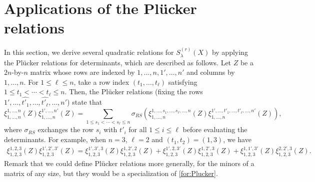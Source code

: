 \documentclass[12pt]{amsart}%
\theoremstyle{definition}
\begin{document}

\section{Applications of the Pl\"{u}cker relations
}
\label{pformula}

In this section,
we derive several quadratic relations for $S^{(r)}_{\lambda}(X)$ by applying the Pl\"{u}cker relations for determinants, which are described as follows.
Let $Z$ be a $2n$-by-$n$ matrix whose rows are indexed by $1,\ldots,n,1',\ldots,n'$ and columns by $1,\ldots,n$.
For $1\leq \ell\leq n$, 
take a row index $(t_1,\ldots,t_\ell)$ satisfying 
$1\leq t_1<\cdots<t_\ell\leq n$.
Then, the Pl\"ucker relations (fixing the rows $1',\ldots,\widehat{t'_1},\ldots,\widehat{t'_\ell},\ldots,n'$)
state that
\begin{equation}
\label{for:Plucker}
\xi^{1,\ldots,n}_{1,\ldots,n}(Z)
\xi^{1',\ldots,n'}_{1,\ldots,n}(Z)
=\sum_{1\leq s_1<\cdots<s_\ell\leq n}
\sigma_{RS}(
\xi^{1,\ldots,s_1,\ldots,s_\ell,\ldots,n}_
{1,\ldots,n}(Z)
\xi^{1',\ldots,t'_1,\ldots,t'_\ell,\ldots,n'}_
{1,\ldots,n}(Z)),    
\end{equation}
where $\sigma_{RS}$ exchanges the row $s_i$ with $t'_i$ for all $1\le i\le \ell$ before evaluating the determinants. 
For example, when $n=3$, $\ell=2$ and $(t_1,t_2)=(1,3)$, we have 
\begin{align*}
\xi^{1,2,3}_{1,2,3}(Z)
\xi^{1',2',3'}_{1,2,3}(Z)
=
\xi^{1',3',3}_{1,2,3}(Z)\xi^{1,2',2}_{1,2,3}(Z)
+\xi^{1',2,3'}_{1,2,3}(Z)\xi^{1,2',3}_{1,2,3}(Z)
+\xi^{1,1',3'}_{1,2,3}(Z)\xi^{2,2',3}_{1,2,3}(Z).
\end{align*}
Remark that we could define
Pl\"ucker relations more generally, for the minors of a matrix of any size, but they would be a specialization of \eqref{for:Plucker}.

\end{document}
